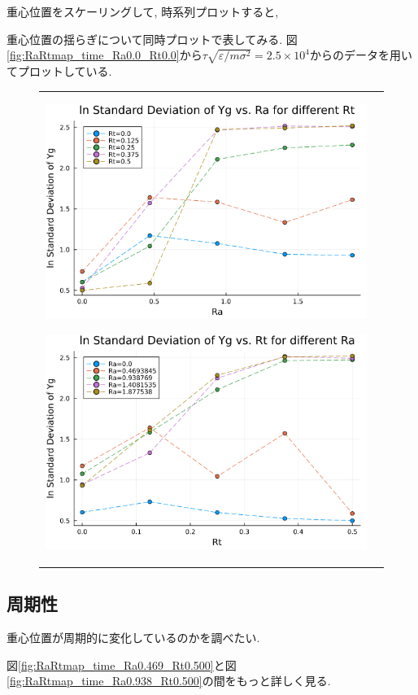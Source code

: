 

重心位置をスケーリングして, 時系列プロットすると,



重心位置の揺らぎについて同時プロットで表してみる. 図\ref{fig:RaRtmap_time_Ra0.0_Rt0.0}から$\tau \sqrt{\varepsilon / m \sigma^2} = 2.5 \times 10^{4}$からのデータを用いてプロットしている.

\begin{figure}[H]
  \begin{tabular}{cc}
    \begin{minipage}[t]{0.5\hsize}
      \centering
      \includegraphics[width=\textwidth]{image/lnStdYg_Ra_ti25000.png}
      \subcaption{}
      \label{}
    \end{minipage}
    \begin{minipage}[t]{0.5\hsize}
      \centering
      \includegraphics[width=\textwidth]{image/lnStdYg_Rt_ti25000.png}
      \subcaption{}
      \label{}
    \end{minipage}
  \end{tabular}
  \caption{}
  \label{}
\end{figure}

\subsection{周期性}

重心位置が周期的に変化しているのかを調べたい.

図\ref{fig:RaRtmap_time_Ra0.469_Rt0.500}と図\ref{fig:RaRtmap_time_Ra0.938_Rt0.500}の間をもっと詳しく見る.

